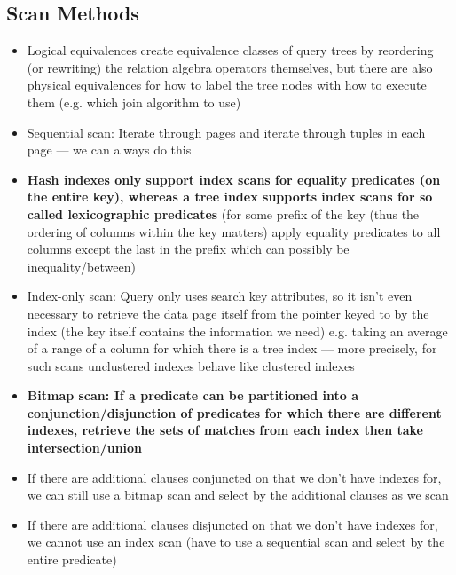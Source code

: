 \documentclass[20pt,a4paper,landscape]{extarticle}
\begin{document}
\begin{flushleft}
\subsection{Scan Methods}
\begin{itemize}
\item Logical equivalences create equivalence classes of query trees by reordering (or rewriting) the relation algebra operators themselves, but there are also physical equivalences for how to label the tree nodes with how to execute them (e.g. which join algorithm to use)
\item Sequential scan: Iterate through pages and iterate through tuples in each page --- we can always do this
\item \textbf{Hash indexes only support index scans for equality predicates (on the entire key), whereas a tree index supports index scans for so called lexicographic predicates} (for some prefix of the key (thus the ordering of columns within the key matters) apply equality predicates to all columns except the last in the prefix which can possibly be inequality/between)
\item Index-only scan: Query only uses search key attributes, so it isn’t even necessary to retrieve the data page itself from the pointer keyed to by the index (the key itself contains the information we need) e.g. taking an average of a range of a column for which there is a tree index --- more precisely, for such scans unclustered indexes behave like clustered indexes
\item \textbf{Bitmap scan: If a predicate can be partitioned into a conjunction/disjunction of predicates for which there are different indexes, retrieve the sets of matches from each index then take intersection/union}
\item If there are additional clauses conjuncted on that we don’t have indexes for, we can still use a bitmap scan and select by the additional clauses as we scan
\item If there are additional clauses disjuncted on that we don’t have indexes for, we cannot use an index scan (have to use a sequential scan and select by the entire predicate)
\end{itemize}

\end{flushleft}
\end{document}
